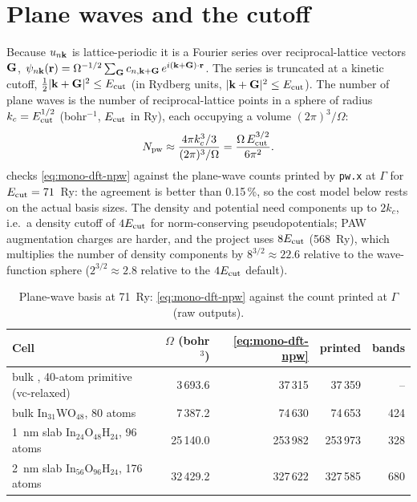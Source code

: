 
\section{Plane waves and the cutoff}
\label{sec:mono-dft-pw}

Because $u_{n\mathbf{k}}$ is lattice-periodic it is a Fourier series over reciprocal-lattice vectors $\mathbf{G}$,
$\psi_{n\mathbf{k}}(\mathbf{r}) = \Omega^{-1/2}\sum_{\mathbf{G}} c_{n,\mathbf{k}+\mathbf{G}}\,e^{i(\mathbf{k}+\mathbf{G})\cdot\mathbf{r}}$. The series is truncated at a kinetic
cutoff, $\tfrac12|\mathbf{k}+\mathbf{G}|^2 \le E_{\mathrm{cut}}$ (in Rydberg units, $|\mathbf{k}+\mathbf{G}|^2 \le E_{\mathrm{cut}}$). The number of plane waves is the
number of reciprocal-lattice points in a sphere of radius $k_c = E_{\mathrm{cut}}^{1/2}$ (bohr$^{-1}$, $E_{\mathrm{cut}}$ in Ry), each
occupying a volume $(2\pi)^3/\Omega$:
\begin{equation}
N_{\mathrm{pw}} \approx \frac{4\pi k_c^3/3}{(2\pi)^3/\Omega} = \frac{\Omega\,E_{\mathrm{cut}}^{3/2}}{6\pi^2} .
\label{eq:mono-dft-npw}
\end{equation}
 checks \cref{eq:mono-dft-npw} against the plane-wave counts printed by \texttt{pw.x} at
$\Gamma$ for $E_{\mathrm{cut}} = 71$~Ry: the agreement is better than 0.15\,\%, so the cost model below rests on the actual basis
sizes. The density and potential need components up to $2k_c$, i.e.\ a density cutoff of $4E_{\mathrm{cut}}$ for norm-conserving
pseudopotentials; PAW augmentation charges are harder, and the project uses $8E_{\mathrm{cut}}$ (568~Ry), which multiplies the
number of density components by $8^{3/2} \approx 22.6$ relative to the wave-function sphere ($2^{3/2} \approx 2.8$
relative to the $4E_{\mathrm{cut}}$ default).

\begin{table}[htbp]\centering\small
\caption{Plane-wave basis at 71~Ry: \cref{eq:mono-dft-npw} against the count printed at $\Gamma$ (raw outputs).}
\label{tab:mono-dft-npw}
\begin{tabular}{lrrrr}\toprule
Cell & $\Omega$ (bohr$^3$) & \cref{eq:mono-dft-npw} & printed & bands \\\midrule
bulk \InO{}, 40-atom primitive (vc-relaxed) & 3\,693.6 & 37\,315 & 37\,359 & -- \\
bulk In$_{31}$WO$_{48}$, 80 atoms & 7\,387.2 & 74\,630 & 74\,653 & 424 \\
1~nm slab In$_{24}$O$_{48}$H$_{24}$, 96 atoms & 25\,140.0 & 253\,982 & 253\,973 & 328 \\
2~nm slab In$_{56}$O$_{96}$H$_{24}$, 176 atoms & 32\,429.2 & 327\,622 & 327\,585 & 680 \\\bottomrule
\end{tabular}
\end{table}

